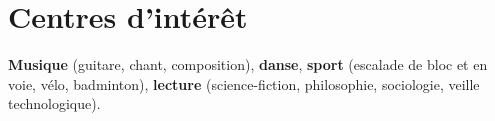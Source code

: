 \documentclass[11pt,a4paper,sans]{moderncv} %
\renewcommand*{\cvitem}[3][.25em]{%
\ifthenelse{\equal{#2}{}}{}{\hintstyle{#2} }{#3}%
\par\addvspace{#1}}
\begin{document}

\section{Centres d'intérêt}
\textbf{Musique} (guitare, chant, composition),
\textbf{danse},
\textbf{sport} (escalade de bloc et en voie, vélo, badminton),
\textbf{lecture} (science-fiction, philosophie, sociologie, veille technologique).

\end{document}
